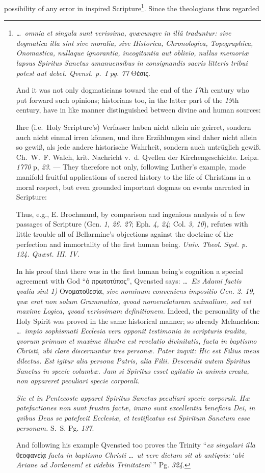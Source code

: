 \documentclass[12pt]{book}
\begin{document}
possibility of any error in inspired Scripture\footnote{\textit{\ldots\ omnia
et singula sunt verissima, qvæcunqve in illâ traduntur: sive dogmatica illa
sint sive moralia, sive Historica, Chronologica, Topographica, Onomastica,
nullaque ignorantia, incogitantia aut oblivio, nullus memoriæ lapsus
Spiritus Sanctus amanuensibus in consignandis sacris litteris tribui potest
aut debet. Qvenst. p.~I pg. 77} Θέσις.

And it was not only dogmaticians toward the end of the \textit{17}th century
who put forward such opinions; historians too, in the latter part of the
\textit{19}th century, have in like manner distinguished between divine and
human sources:

Ihre (i.e.\ Holy Scripture's) Verfasser haben nicht allein nie geirret,
sondern auch nicht einmal irren können, und ihre Erzählungen sind daher nicht
allein so gewiß, als jede andere historische Wahrheit, sondern auch
untrüglich gewiß. Ch.~W.~F. Walch, krit. Nachricht v.~d. Qvellen der
Kirchengeschichte. Leipz. \textit{1770} p, \textit{23}. --- They therefore
not only, following Luther's example, made manifold fruitful applications of
sacred history to the life of Christians in a moral respect, but even
grounded important dogmas on events narrated in Scripture:

Thus, e.g., E. Brochmand, by comparison and ingenious analysis of a few
passages of Scripture (Gen. \textit{1, 26. 27}; Eph. \textit{4, 24}; Col.
\textit{3, 10}), refutes with little trouble all of Bellarmine's objections
against the doctrine of the perfection and immortality of the first human
being. \textit{Univ. Theol. Syst. p. 124. Quæst. III. IV.}

In his proof that there was in the first human being's cognition a special
agreement with God ``ὁ πρωτοτύπος'', Qvensted says: \textit{\ldots\ Ex
Adami factis qvalia sint 1)} Ονοματοθεσία, \textit{sive nominum conveniens
impositio Gen. 2. 19, qvæ erat non solum \emph{Grammatica}, qvoad
nomenclaturam animalium, sed vel maxime \emph{Logica}, qvoad verissimam
definitionem.} Indeed, the personality of the Holy Spirit was proved in the
same historical manner; so already Melanchton: \textit{\ldots\ impio
sophismati Ecclesia vera opponit testimonia in scripturis tradita, qvorum
primum et maxime illustre est revelatio divinitatis, facta in baptismo
Christi, ubi clare discernuntur tres personæ. Pater inqvit: Hic est Filius
meus dilectus. Est igitur alia persona Patris, alia Filii. Descendit autem
Spiritus Sanctus in specie columbæ. Jam si Spiritus esset agitatio in animis
creata, non appareret peculiari specie corporali.}

\textit{Sic et in Pentecoste apparet Spiritus Sanctus peculiari specie
corporali. Hæ patefactiones non sunt frustra factæ, immo sunt excellentia
beneficia Dei, in qvibus Deus se patefecit Ecclesiæ, et testificatus est
Spiritum Sanctum esse personam.} S.~S. Pg. \textit{137}.

And following his example Qvensted too proves the Trinity ``\textit{ex
singulari illa} θεοφανείᾳ \textit{facta in baptismo Christi \ldots\ ut vere
dictum sit ab antiqvis:} `\textit{abi Ariane ad Jordanem! et videbis
Trinitatem}'\,'' Pg. \textit{324}.}. Since the theologians thus regarded
\end{document}
